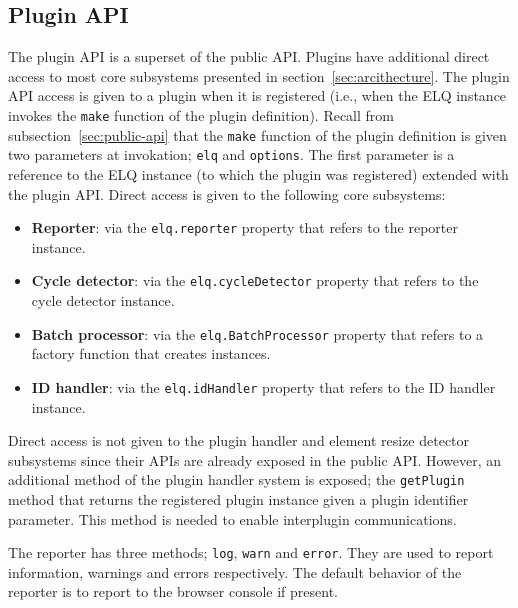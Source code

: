 \documentclass[a4paper,11pt]{kth-mag}
\newcommand{\code}[1]{\texttt{#1}}
\newcommand\abbr[2][]{\uppercase{#2}\ifthenelse{\equal{#1}{}}%
                     {}{#1}}
\begin{document}
      \subsection{Plugin API}\label{sec:plugin-api}
        The plugin \gls{API} is a superset of the public \gls{API}.
        Plugins have additional direct access to most core subsystems presented in section~\ref{sec:arcithecture}.
        The plugin \gls{API} access is given to a plugin when it is registered (i.e., when the \abbr{elq} instance invokes the \code{make} function of the plugin definition).
        Recall from subsection~\ref{sec:public-api} that the \code{make} function of the plugin definition is given two parameters at invokation; \code{elq} and \code{options}.
        The first parameter is a reference to the \abbr{ELQ} instance (to which the plugin was registered) extended with the plugin \gls{API}.
        Direct access is given to the following core subsystems:
        \begin{itemize}
          \item \textbf{Reporter}: via the \code{elq.reporter} property that refers to the reporter instance.
          \item \textbf{Cycle detector}: via the \code{elq.cycleDetector} property that refers to the cycle detector instance.
          \item \textbf{Batch processor}: via the \code{elq.BatchProcessor} property that refers to a factory function that creates  instances.
          \item \textbf{\abbr{ID} handler}: via the \code{elq.idHandler} property that refers to the \abbr{ID} handler instance. 
        \end{itemize}
        Direct access is not given to the plugin handler and element resize detector subsystems since their \glspl{API} are already exposed in the public \gls{API}.
        However, an additional method of the plugin handler system is exposed; the \code{getPlugin} method that returns the registered plugin instance given a plugin identifier parameter.
        This method is needed to enable interplugin communications.

        The reporter has three methods; \code{log}, \code{warn} and \code{error}.
        They are used to report information, warnings and errors respectively.
        The default behavior of the reporter is to report to the browser console if present.
\end{document}
